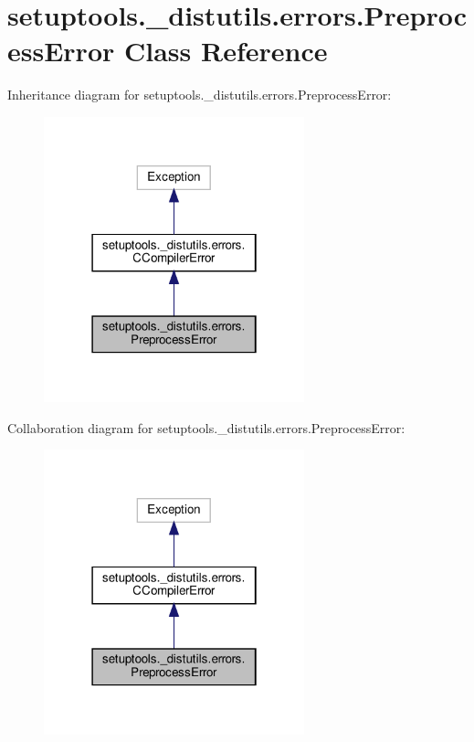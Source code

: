 \hypertarget{classsetuptools_1_1__distutils_1_1errors_1_1PreprocessError}{}\section{setuptools.\+\_\+distutils.\+errors.\+Preprocess\+Error Class Reference}
\label{classsetuptools_1_1__distutils_1_1errors_1_1PreprocessError}


Inheritance diagram for setuptools.\+\_\+distutils.\+errors.\+Preprocess\+Error\+:
\nopagebreak
\begin{figure}[H]
\begin{center}
\leavevmode
\includegraphics[width=214pt]{classsetuptools_1_1__distutils_1_1errors_1_1PreprocessError__inherit__graph}
\end{center}
\end{figure}


Collaboration diagram for setuptools.\+\_\+distutils.\+errors.\+Preprocess\+Error\+:
\nopagebreak
\begin{figure}[H]
\begin{center}
\leavevmode
\includegraphics[width=214pt]{classsetuptools_1_1__distutils_1_1errors_1_1PreprocessError__coll__graph}
\end{center}
\end{figure}



